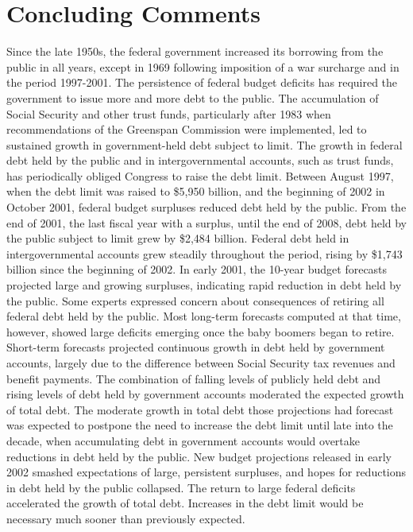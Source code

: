 \section{Concluding Comments}
\label{sec:Conclusio}

Since the late 1950s, the federal government increased its borrowing from the public in all years, except in 1969 following imposition of a war surcharge and in the period 1997-2001. The persistence of federal budget deficits has required the government to issue more and more debt to the public. The accumulation of Social Security and other trust funds, particularly after 1983 when recommendations of the Greenspan Commission were implemented, led to sustained growth in government-held debt subject to limit. The growth in federal debt held by the public and in intergovernmental accounts, such as trust funds, has periodically obliged Congress to raise the debt limit.
\nextline
Between August 1997, when the debt limit was raised to \$5,950 billion, and the beginning of 2002 in October 2001, federal budget surpluses reduced debt held by the public. From the end of 2001, the last fiscal year with a surplus, until the end of 2008, debt held by the public subject to limit grew by \$2,484 billion. Federal debt held in intergovernmental accounts grew steadily throughout the period, rising by \$1,743 billion since the beginning of 2002.
\nextline
In early 2001, the 10-year budget forecasts projected large and growing surpluses, indicating rapid reduction in debt held by the public. Some experts expressed concern about consequences of retiring all federal debt held by the public. Most long-term forecasts computed at that time, however, showed large deficits emerging once the baby boomers began to retire. Short-term forecasts projected continuous growth in debt held by government accounts, largely due to the difference between Social Security tax revenues and benefit payments. The combination of falling levels of publicly held debt and rising levels of debt held by government accounts moderated the expected growth of total debt. The moderate growth in total debt those projections had forecast was expected to postpone the need to increase the debt limit until late into the decade, when accumulating debt in government accounts would overtake reductions in debt held by the public.
\nextline
New budget projections released in early 2002 smashed expectations of large, persistent surpluses, and hopes for reductions in debt held by the public collapsed. The return to large federal deficits accelerated the growth of total debt. Increases in the debt limit would be necessary much sooner than previously expected.

